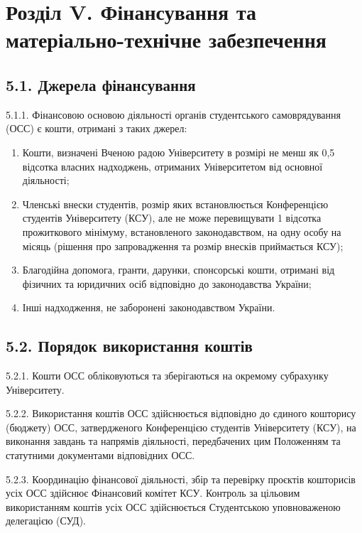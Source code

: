 \section*{Розділ V. Фінансування та матеріально-технічне забезпечення}

\subsection*{5.1. Джерела фінансування}
    5.1.1. Фінансовою основою діяльності органів студентського самоврядування (ОСС) є кошти, отримані з таких джерел:

        \begin{enumerate}[label=\alph*)]
            \item Кошти, визначені Вченою радою Університету в розмірі не менш як 0,5 відсотка власних надходжень, отриманих Університетом від основної діяльності;
            \item Членські внески студентів, розмір яких встановлюється Конференцією студентів Університету (КСУ), але не може перевищувати 1 відсотка прожиткового мінімуму, встановленого законодавством, на одну особу на місяць (рішення про запровадження та розмір внесків приймається КСУ);
            \item Благодійна допомога, гранти, дарунки, спонсорські кошти, отримані від фізичних та юридичних осіб відповідно до законодавства України;
            \item Інші надходження, не заборонені законодавством України.
        \end{enumerate}

\subsection*{5.2. Порядок використання коштів}
    5.2.1. Кошти ОСС обліковуються та зберігаються на окремому субрахунку Університету.

    5.2.2. Використання коштів ОСС здійснюється відповідно до єдиного кошторису (бюджету) ОСС, затвердженого Конференцією студентів Університету (КСУ), на виконання завдань та напрямів діяльності, передбачених цим Положенням та статутними документами відповідних ОСС.

    5.2.3. Координацію фінансової діяльності, збір та перевірку проєктів кошторисів усіх ОСС здійснює Фінансовий комітет КСУ. Контроль за цільовим використанням коштів усіх ОСС здійснюється Студентською уповноваженою делегацією (СУД).

